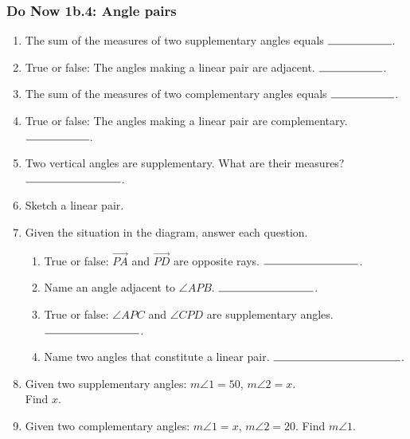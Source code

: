 \documentclass[12pt, oneside]{article}
\begin{document}
\subsubsection*{Do Now 1b.4: Angle pairs} %
  \vspace{0.5cm}
  \begin{enumerate}

    \item The sum of the measures of two supplementary angles equals $\rule{2cm}{0.15mm}$. \bigskip
    \item True or false: The angles making a linear pair are adjacent. $\rule{2cm}{0.15mm}$. \bigskip
    \item The sum of the measures of two complementary angles equals $\rule{2cm}{0.15mm}$. \bigskip
    \item True or false: The angles making a linear pair are complementary. $\rule{2cm}{0.15mm}$. \bigskip
    \item Two vertical angles are supplementary. What are their measures? $\rule{3cm}{0.15mm}$. \bigskip
    \item Sketch a linear pair. \vspace{3cm}

      \item Given the situation in the diagram, answer each question. \vspace{1cm}
        \begin{flushright}
        \end{flushright}
      \begin{enumerate}
        \item True or false: $\overrightarrow{PA}$ and $\overrightarrow{PD}$ are opposite rays. $\rule{3cm}{0.15mm}$. \bigskip
        \item Name an angle adjacent to $\angle APB$. $\rule{3cm}{0.15mm}$. \bigskip
        \item True or false: $\angle APC$ and $\angle CPD$ are supplementary angles. $\rule{3cm}{0.15mm}$. \bigskip
        \item Name two angles that constitute a linear pair. $\rule{4cm}{0.15mm}$. \bigskip
      \end{enumerate}
  \newpage
            \item Given two supplementary angles: $m \angle 1 = 50$, $m \angle 2 = x$.\\ Find $x$. \vspace{2cm}
            \item Given two complementary angles: $m \angle 1 = x$, $m \angle 2 = 20$. Find $m \angle 1$. \vspace{2cm}


\end{enumerate}
\end{document}
